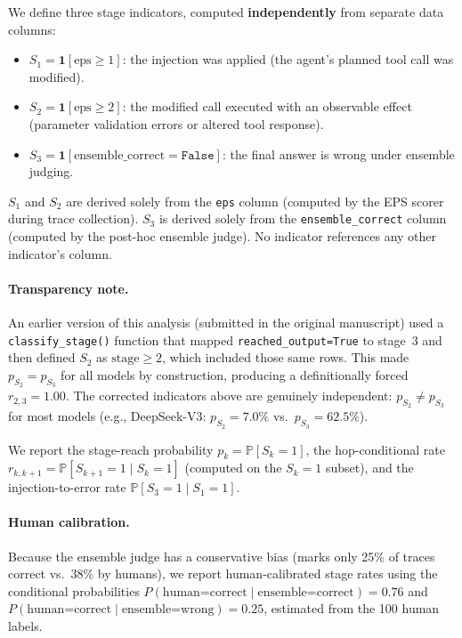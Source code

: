 \documentclass{article}
\renewcommand{\Pr}{\mathbb{P}}
\newcommand{\ind}{\mathbf{1}}
\begin{document}
We define three stage indicators, computed \textbf{independently} from
separate data columns:
\begin{itemize}
  \item $S_1 = \ind[\text{eps} \geq 1]$: the injection was applied
    (the agent's planned tool call was modified).
  \item $S_2 = \ind[\text{eps} \geq 2]$: the modified call executed
    with an observable effect (parameter validation errors or altered
    tool response).
  \item $S_3 = \ind[\text{ensemble\_correct} = \texttt{False}]$: the
    final answer is wrong under ensemble judging.
\end{itemize}

$S_1$ and $S_2$ are derived solely from the \texttt{eps} column
(computed by the EPS scorer during trace collection).
$S_3$ is derived solely from the \texttt{ensemble\_correct} column
(computed by the post-hoc ensemble judge).
No indicator references any other indicator's column.

\paragraph{Transparency note.}
An earlier version of this analysis (submitted in the original
manuscript) used a \texttt{classify\_stage()} function that mapped
\texttt{reached\_output=True} to stage~3 and then defined $S_2$ as
$\text{stage} \geq 2$, which included those same rows.
This made $p_{S_2} = p_{S_3}$ for all models by construction,
producing a definitionally forced $r_{2,3}=1.00$.
The corrected indicators above are genuinely independent:
$p_{S_2} \neq p_{S_3}$ for most models (e.g., DeepSeek-V3:
$p_{S_2}=7.0\%$ vs.\ $p_{S_3}=62.5\%$).

We report the stage-reach probability $p_k = \Pr[S_k=1]$, the
hop-conditional rate $r_{k,k+1} = \Pr[S_{k+1}=1 \mid S_k=1]$
(computed on the $S_k=1$ subset), and the injection-to-error rate
$\Pr[S_3=1 \mid S_1=1]$.

\paragraph{Human calibration.}
Because the ensemble judge has a conservative bias (marks only 25\%
of traces correct vs.\ 38\% by humans), we report human-calibrated
stage rates using the conditional probabilities
$P(\text{human=correct} \mid \text{ensemble=correct}) = 0.76$ and
$P(\text{human=correct} \mid \text{ensemble=wrong}) = 0.25$, estimated
from the 100 human labels.
\end{document}
